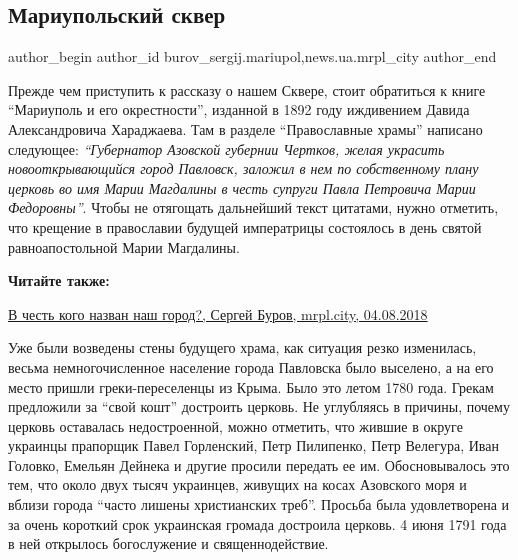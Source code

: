 
 
 
 
 
 
\subsection{Мариупольский сквер}
\label{sec:14_10_2018.stz.news.ua.mrpl_city.1.mariupolskij_skver}
 
\ifcmt
 author_begin
   author_id burov_sergij.mariupol,news.ua.mrpl_city
 author_end
\fi

Прежде чем приступить к рассказу о  нашем  Сквере, стоит обратиться к книге
\enquote{Мариуполь и его окрестности}, изданной в 1892 году иждивением Давида
Александровича Хараджаева. Там в разделе \enquote{Православные храмы}  написано
следующее: \emph{\enquote{Губернатор Азовской губернии Чертков, желая украсить
новооткрывающийся  город Павловск, заложил  в нем по собственному  плану
церковь во имя Марии Магдалины в честь супруги Павла Петровича Марии
Федоровны}}. Чтобы не отягощать дальнейший текст цитатами, нужно отметить, что
крещение в православии будущей императрицы состоялось в день святой
равноапостольной Марии Магдалины.

\textbf{Читайте также:} 

\href{https://archive.org/details/04_08_2018.sergij_burov.mrpl_city.v_chest_kogo_nazvan_nash_gorod}{%
В честь кого назван наш город?, Сергей Буров, mrpl.city, 04.08.2018}

Уже были возведены стены будущего храма, как ситуация резко изменилась, весьма
немногочисленное население города Павловска было выселено, а на его место
пришли греки-переселенцы из Крыма. Было это летом  1780 года. Грекам предложили
за \enquote{свой кошт} достроить церковь. Не углубляясь в причины, почему церковь
оставалась недостроенной, можно отметить, что жившие в округе украинцы
прапорщик Павел Горленский, Петр Пилипенко, Петр Велегура, Иван Головко,
Емельян Дейнека и другие просили передать ее им. Обосновывалось это тем, что
около двух тысяч украинцев, живущих на косах Азовского моря и вблизи города
\enquote{часто лишены христианских треб}. Просьба была удовлетворена и за очень
короткий срок украинская громада достроила церковь. 4 июня 1791 года в ней
открылось богослужение и священнодействие.

